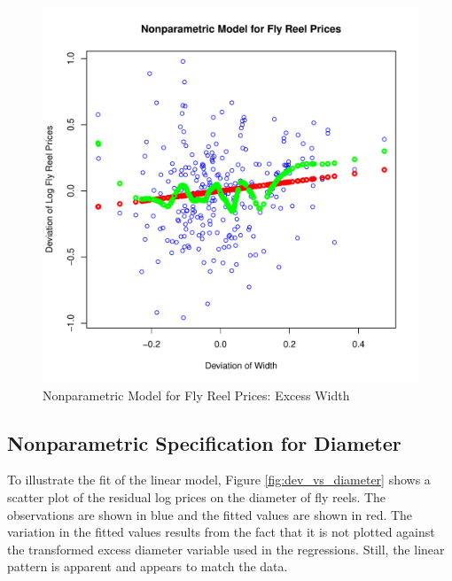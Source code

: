 \documentclass[11pt]{paper}
\begin{document}
\begin{figure}[h!]
  \centering
  \includegraphics[scale = 0.5, keepaspectratio=true]{../Figures/dev_np_vs_width_dev}
  \caption{Nonparametric Model for Fly Reel Prices: Excess Width} \label{fig:dev_np_vs_width_dev}
\end{figure}


\clearpage
\subsection{Nonparametric Specification for Diameter}

To illustrate the fit of the linear model, 
Figure \ref{fig:dev_vs_diameter} shows a scatter plot 
of the residual log prices on 
the diameter of fly reels. 
The observations are shown in blue
and the fitted values are shown in red.
The variation in the fitted values results from the 
fact that it is not plotted against the transformed 
excess diameter variable 
used in the regressions.
Still, the linear pattern is apparent
and appears to match the data. 
\end{document}
